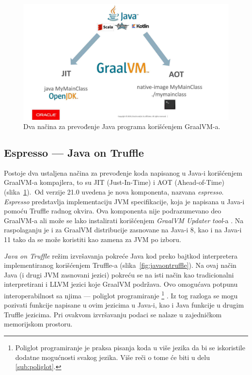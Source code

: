 \documentclass[a4paper]{article}
\begin{document}
\begin{figure}
	\begin{center}
	\includegraphics[scale=0.25]{imgs/run_java.jpg}
	\end{center}
	\caption{Dva načina za prevođenje Java programa korišćenjem GraalVM-a.}
	\label{fig:runjava}
\end{figure}


\subsection{Espresso --- Java on Truffle}
\label{sub:espresso}

Postoje dva ustaljena načina za prevođenje koda napisanog u Java-i korišćenjem GraalVM-a kompajlera, to su JIT (Just-In-Time) i AOT (Ahead-of-Time) (slika~\ref{fig:runjava}).\ Od verzije 21.0 uvedena je nova komponenta, nazvana \emph{espresso}. \emph{Espresso} predstavlja implementaciju JVM specifikacije, koja je napisana u Java-i pomoću Truffle radnog okvira. Ova komponenta nije podrazumevano deo GraalVM-a ali može se lako instalirati korišćenjem \emph{GraalVM Updater tool}-a \cite{graalvm}. Na raspolaganju je i za GraalVM distribucije zasnovane na Java-i 8, kao i na Java-i 11 tako da se može koristiti kao zamena za JVM po izboru.

\emph{Java on Truffle} režim izvršavanja pokreće Java kod preko bajtkod interpretera implementiranog korišćenjem Truffle-a (slika~\ref{fig:javaontruffle}). Na ovaj način Java (i drugi JVM zasnovani jezici) pokreću se na isti način kao tradicionalni interpretirani i LLVM jezici koje GraalVM podržava. Ovo omogućava potpunu interoperabilnost sa njima --- poliglot programiranje \footnote{Poliglot programiranje je praksa pisanja koda u više jezika da bi se iskoristile dodatne mogućnosti svakog jezika. Više reči o tome će biti u delu \ref{sub:poliglot}.} \cite{grooteman2017java, graalvm}. Iz tog razloga se mogu pozivati funkcije napisane u ovim jezicima u Java-i, kao i Java funkcije u drugim Truffle jezicima. Pri ovakvom izvršavanju podaci se nalaze u zajedničkom memorijskom prostoru.
\end{document}
